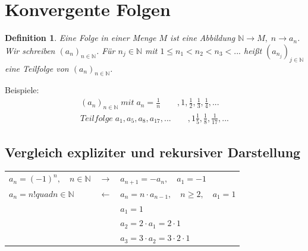 \documentclass[12pt,a4paper]{report}%
\newtheorem{definition}[satz]{Definition}
\numberwithin{equation}{section}
\newcommand{\N}{\mathbb{N}}
\numberwithin{equation}{subsection}
\begin{document}
\section{Konvergente Folgen}
  \begin{definition}
    Eine Folge in einer Menge $M$ ist eine Abbildung $\N \rightarrow M,\; n\rightarrow a_n$. Wir schreiben $(a_n)_{n \in \N}$. Für $n_j \in \N$ mit $1\leq n_1 < n_2 < n_3 < ...$ heißt $(a_{n_j})_{j\in \N}$ eine Teilfolge von $(a_n)_{n \in \N}$.
  \end{definition}
  Beispiele:
  \begin{align*}
    (a_n)_{n \in \N}\; mit\; a_n = \frac{1}{n} \qquad , 1, \frac{1}{2}, \frac{1}{3}, \frac{1}{4},...\\
    Teilfolge\;a_1, a_5, a_8, a_{17},... \qquad  ,1 \frac{1}{5}, \frac{1}{8}, \frac{1}{17}, ...
  \end{align*}
  \subsection{Vergleich expliziter und rekursiver Darstellung}
  \begin{tabular}{l c l}
    $a_n = (-1)^n ,\quad n \in \N$ & $\rightarrow$ & $a_{n+1} = -a_n,\quad a_1 = -1$\\
    $a_n = n! quad n \in \N$ & $\leftarrow$ & $ a_n = n \cdot a_{n-1}, \quad n \geq 2, \quad a_1 = 1$\\
    $\;$ & $\;$ & $a_1 = 1$ \\
    $\;$ & $\;$ & $a_2 = 2\cdot a_1 = 2 \cdot 1$ \\
    $\;$ & $\;$ & $a_3 = 3\cdot a_2 = 3 \cdot 2 \cdot 1$ \\
  \end{tabular}    

  
\end{document}
